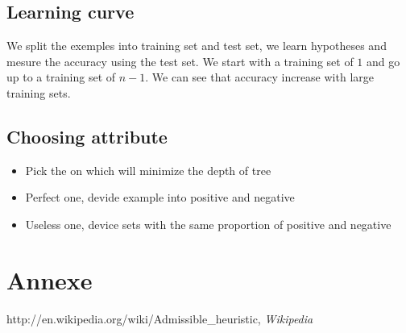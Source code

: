 \subsection{Learning curve}
We split the exemples into training set and test set, we learn hypotheses and mesure the accuracy using the test set. 
We start with a training set of $1$ and go up to a training set of $n-1$. We can see that accuracy increase with large training sets.

\subsection{Choosing attribute}
\begin{itemize}
\item Pick the on which will minimize the depth of tree
\item Perfect one, devide example into positive and negative
\item Useless one, device sets with the same proportion of positive and negative
\end{itemize}

\section{Annexe}
%

\begin{thebibliography}{1}
 http://en.wikipedia.org/wiki/Admissible\_heuristic, {\em Wikipedia}
\end{thebibliography}



